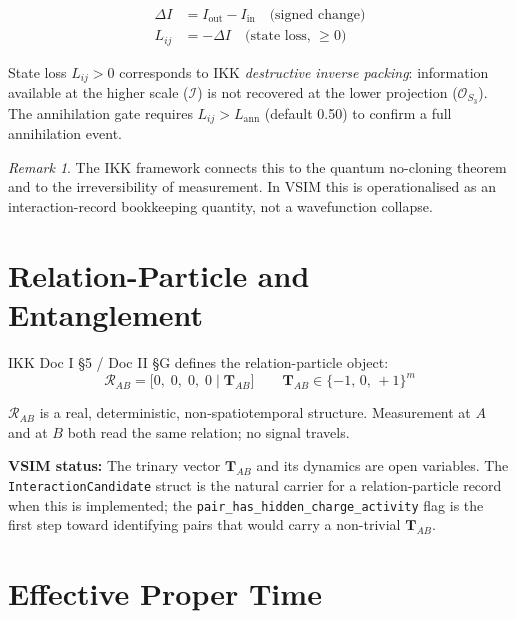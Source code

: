 \documentclass[11pt, a4paper, oneside]{article}
\newcommand{\Id}{\mathcal{I}}
\theoremstyle{definition}
\theoremstyle{remark}
\newtheorem{remark}{Remark}[section]
\begin{document}
\begin{align}
  \Delta I   &= I_\text{out} - I_\text{in}   \quad\text{(signed change)} \\
  L_{ij}     &= -\Delta I                    \quad\text{(state loss, } \geq 0\text{)}
\end{align}

State loss $L_{ij} > 0$ corresponds to IKK \emph{destructive inverse packing}:
information available at the higher scale ($\Id$) is not recovered at the
lower projection ($\mathcal{O}_{S_3}$).  The annihilation gate requires
$L_{ij} > L_\text{ann}$ (default 0.50) to confirm a full annihilation event.

\begin{remark}
  The IKK framework connects this to the quantum no-cloning theorem and
  to the irreversibility of measurement.  In VSIM this is operationalised
  as an interaction-record bookkeeping quantity, not a wavefunction collapse.
\end{remark}

\section{Relation-Particle and Entanglement}

IKK Doc I \S5 / Doc II \S G defines the relation-particle object:
\begin{equation}
  \mathcal{R}_{AB}
  = \bigl[0,\; 0,\; 0,\; 0 \mid \mathbf{T}_{AB}\bigr]
  \qquad
  \mathbf{T}_{AB} \in \{-1,\, 0,\, +1\}^m
\end{equation}

$\mathcal{R}_{AB}$ is a real, deterministic, non-spatiotemporal structure.
Measurement at $A$ and at $B$ both read the same relation; no signal travels.

\textbf{VSIM status:} The trinary vector $\mathbf{T}_{AB}$ and its dynamics
are open variables.  The \texttt{InteractionCandidate} struct is the natural
carrier for a relation-particle record when this is implemented; the
\texttt{pair\_has\_hidden\_charge\_activity} flag is the first step toward
identifying pairs that would carry a non-trivial $\mathbf{T}_{AB}$.

\section{Effective Proper Time}
\end{document}
